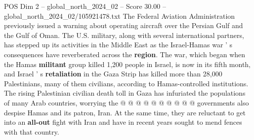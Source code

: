 \begin{textsample}{POS Dim 2 – global\_north\_2024\_02 – Score 30.00 – global\_north\_2024\_02/105921478.txt}
The Federal Aviation Administration previously issued a warning about operating aircraft over the Persian Gulf and the Gulf of Oman.
The U.S. military, along with several international partners, has stepped up its activities in the Middle East as the Israel-Hamas war ' s consequences have reverberated across the \textbf{region}.
The war, which began when the Hamas \textbf{militant} group killed 1,200 people in Israel, is now in its fifth month, and Israel ' s \textbf{retaliation} in the Gaza Strip has killed more than 28,000 Palestinians, many of them civilians, according to Hamas-controlled institutions.
The rising Palestinian civilian death toll in Gaza has infuriated the populations of many Arab countries, worrying the @ @ @ @ @ @ @ @ @ @ governments also despise Hamas and its patron, Iran.
At the same time, they are reluctant to get into an \textbf{all-out} fight with Iran and have in recent years sought to mend fences with that country.

\end{textsample}
